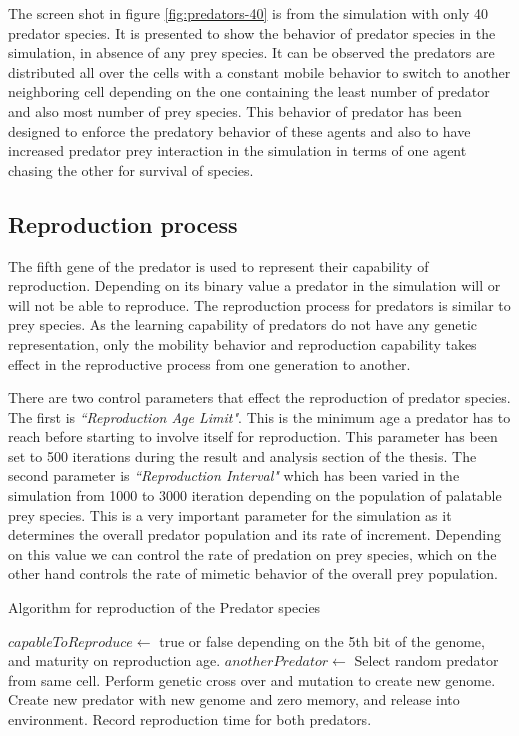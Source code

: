 The screen shot in figure \ref{fig:predators-40} is from the simulation with only 40 predator species. It is presented to show the behavior of predator species in the simulation, in absence of any prey species. It can be observed the predators are distributed all over the cells with a constant mobile behavior to switch to another neighboring cell depending on the one containing the least number of predator and also most number of prey species. This behavior of predator has been designed to enforce the predatory behavior of these agents and also to have increased predator prey interaction in the simulation in terms of one agent chasing the other for survival of species. 

\subsection{Reproduction process}
The  fifth gene of the predator is used to represent their capability of reproduction.  Depending on its binary value a predator in the simulation will or will not be able to reproduce. The reproduction process for predators is similar to prey species. As the learning capability of predators do not have any genetic representation, only the mobility behavior and reproduction capability takes effect in the reproductive process from one generation to another. 

There are two control parameters that effect the reproduction of predator species. The first is \textsl{``Reproduction Age Limit"}. This is the minimum age a predator has to reach before starting to involve itself for reproduction. This parameter has been set to 500 iterations during the result and analysis section of the thesis. The second parameter is \textsl{``Reproduction Interval"} which has been varied in the simulation from 1000 to 3000 iteration depending on the population of palatable prey species. This is a very important parameter for the simulation as it determines the overall predator population and its rate of increment. Depending on this value we can control the rate of predation on prey species, which on the other hand controls the rate of mimetic behavior of the overall prey population.

\begin{algorithm}[H]
	\caption{Algorithm for reproduction of the Predator species}
	\label{algo:algorithm-reproduction-predator}
	\begin{algorithmic}
			\STATE $capableToReproduce \gets$ true or false depending on the 5th bit of the genome, and maturity on reproduction age.
				\STATE $anotherPredator \gets$ Select random predator from same cell.
					\STATE Perform genetic cross over and mutation to create new genome.
					\STATE Create new predator with new genome and zero memory, and release into environment.
					\STATE Record reproduction time for both predators.
				\ENDIF
			\ENDIF
		\ENDFOR
	\end{algorithmic}
\end{algorithm}

